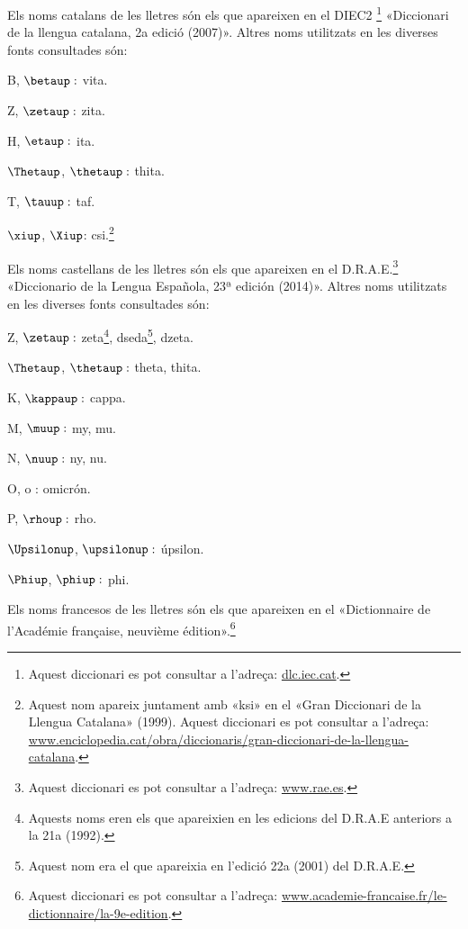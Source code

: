 Els noms catalans de les lletres són els que apareixen en el DIEC2 \footnote{Aquest diccionari es pot consultar a l'adreça: \href{http://dlc.iec.cat/}{dlc.iec.cat}.} «Diccionari de la llengua catalana, 2a edició (2007)». Altres noms utilitzats en
les diverses fonts consultades són:
\begin{multicols}{3}
\begin{list}{}
   {\setlength{\labelwidth}{16mm} \setlength{\leftmargin}{16mm} \setlength{\labelsep}{2mm}}
   \item[B, $\betaup :$] vita.
   \item[Z, $\zetaup :$] zita.
   \item[H, $\etaup :$] ita.
   \item[$\Thetaup$, $\thetaup :$] thita.
   \item[T, $\tauup :$] taf.
   \item[$\xiup$, $\Xiup$:] csi.\footnote{Aquest nom apareix juntament amb «ksi» en el «Gran Diccionari de la Llengua Catalana» (1999). Aquest diccionari es pot consultar a l'adreça:  \href{http://www.enciclopedia.cat/obra/diccionaris/gran-diccionari-de-la-llengua-catalana}{www.enciclopedia.cat/obra/diccionaris/gran-diccionari-de-la-llengua-catalana}.}
\end{list}
\end{multicols}

Els noms castellans de les lletres són els que apareixen en el D.R.A.E.\footnote{Aquest diccionari es pot consultar a l'adreça:  \href{http://www.rae.es/}{www.rae.es}.}
«Diccionario de la Lengua Española, 23ª
edición (2014)». Altres noms utilitzats en les diverses fonts
consultades són:
\begin{multicols}{3}
\begin{list}{}
   {\setlength{\labelwidth}{16mm} \setlength{\leftmargin}{16mm} \setlength{\labelsep}{2mm}}
   \item[Z, $\zetaup :$] zeta\footnote{\label{fn:zeta}Aquests noms eren els que apareixien en les edicions
   del D.R.A.E anteriors a la 21a (1992).}, dseda\footnote{Aquest nom era el que apareixia en l'edició 22a (2001) del D.R.A.E.}, dzeta.
   \item[$\Thetaup$, $\thetaup :$] theta, thita.
   \item[K, $\kappaup :$] cappa.
   \item[M, $\muup :$] my, mu.
   \item[N, $\nuup :$] ny, nu.
   \item[O, o :] omicrón.
   \item[P, $\rhoup :$] rho.
   \item[$\Upsilonup$, $\upsilonup :$] úpsilon.
   \item[$\Phiup$, $\phiup :$] phi.
\end{list}
\end{multicols}

Els noms francesos de les lletres són els que apareixen en el «Dictionnaire de l'Académie française, neuvième édition».\footnote{Aquest diccionari es pot consultar a l'adreça: \href{http://www.academie-francaise.fr/le-dictionnaire/la-9e-edition}{www.academie-francaise.fr/le-dictionnaire/la-9e-edition}.} 